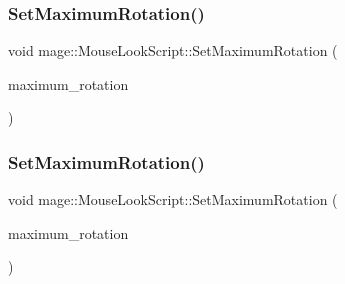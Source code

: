 \hypertarget{classmage_1_1_mouse_look_script_a38b8cefcfbd263017491f9c29b3fbc3c}{}\label{classmage_1_1_mouse_look_script_a38b8cefcfbd263017491f9c29b3fbc3c} 
\subsubsection{\texorpdfstring{Set\+Maximum\+Rotation()}{SetMaximumRotation()}\hspace{0.1cm}{\footnotesize\ttfamily [2/4]}}
{\footnotesize\ttfamily void mage\+::\+Mouse\+Look\+Script\+::\+Set\+Maximum\+Rotation (\begin{DoxyParamCaption}\item[{const X\+M\+F\+L\+O\+A\+T2 \&}]{maximum\+\_\+rotation }\end{DoxyParamCaption})\hspace{0.3cm}{\ttfamily [noexcept]}}

\hypertarget{classmage_1_1_mouse_look_script_a98648bbce4fcaf05c4e831c81a49cef1}{}\label{classmage_1_1_mouse_look_script_a98648bbce4fcaf05c4e831c81a49cef1} 
\subsubsection{\texorpdfstring{Set\+Maximum\+Rotation()}{SetMaximumRotation()}\hspace{0.1cm}{\footnotesize\ttfamily [3/4]}}
{\footnotesize\ttfamily void mage\+::\+Mouse\+Look\+Script\+::\+Set\+Maximum\+Rotation (\begin{DoxyParamCaption}\item[{X\+M\+F\+L\+O\+A\+T2 \&\&}]{maximum\+\_\+rotation }\end{DoxyParamCaption})\hspace{0.3cm}{\ttfamily [noexcept]}}

\hypertarget{classmage_1_1_mouse_look_script_a234ef8a9d21255042d3831a804acc374}{}\label{classmage_1_1_mouse_look_script_a234ef8a9d21255042d3831a804acc374} 
